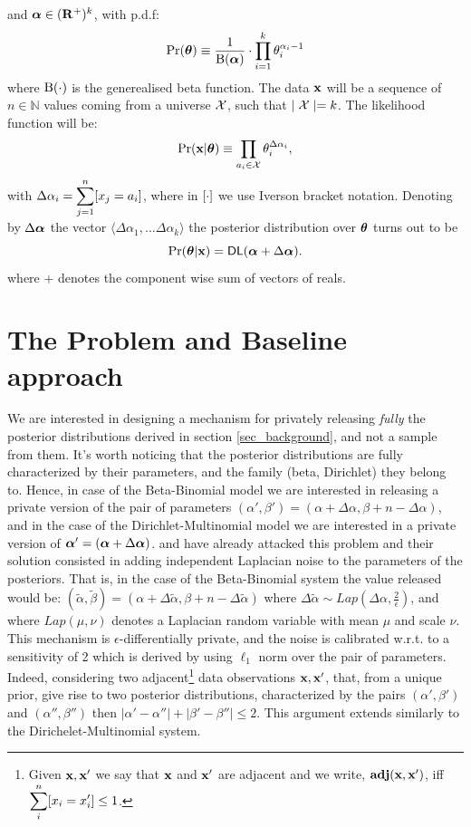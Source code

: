 \documentclass[sigconf, anonymous]{acmart}
\begin{document}
and $\boldsymbol{\alpha}\in(\mathbf{R^{+}})^{k}$, with p.d.f:
\[
  \Pr(\boldsymbol{\theta})\equiv\frac{1}{\boldsymbol{\textup{B}}(\boldsymbol{\alpha})}\cdot \displaystyle\prod_{i=1}^{k}{\theta_i^{\alpha_i-1}}
\]
where $\boldsymbol{\textup{B}}(\cdot)$ is the generealised beta function.
The data $\textbf{x}$ will be a sequence of $n\in\mathbb{N}$ values coming from a universe $\mathcal{X}$, such that $\mid\mathcal{X} \mid=k$.
The likelihood function will be:
\[
  \Pr(\textbf{x}|\boldsymbol{\theta})\equiv \displaystyle\prod_{a_i\in\mathcal{X}}\theta_{i}^{\Delta \alpha_i},
\]
with $\Delta \alpha_i=\displaystyle\sum_{j=1}^{n}[x_j=a_i]$, where in $[\cdot]$ we use
Iverson bracket notation. Denoting by $\Delta\boldsymbol{\alpha}$ the vector $\langle  \Delta\alpha_1,\dots \Delta\alpha_k \rangle$ the posterior distribution over $\boldsymbol{\theta}$ turns out to be
\[
  \Pr(\boldsymbol{\theta}|\textbf{x})=\mathsf{DL}(\boldsymbol{\alpha}+\Delta \boldsymbol{\alpha}). 
\]
where $+$ denotes the component wise  sum of vectors of reals. 


\section{The Problem and Baseline approach}
\label{sec:base}
We are interested in designing a mechanism for privately releasing
\emph{fully} the posterior distributions derived in section \ref{sec_background},
and not a sample from them.  It's worth noticing that the posterior
distributions are fully characterized by their parameters, and the
family (beta, Dirichlet) they belong to.  Hence, in case of the
Beta-Binomial model we are interested in releasing a private version
of the pair of parameters $(\alpha',\beta')=(\alpha + \Delta \alpha,\beta + n - \Delta \alpha)$, and
in the case of the Dirichlet-Multinomial model we are interested in a
private version of $\boldsymbol{\alpha}'=(\boldsymbol{\alpha} + \Delta \boldsymbol{\alpha})$. \citet{zhang2016differential} and \citet{xiao2012bayesian} have
already attacked this problem and their solution consisted in adding
independent Laplacian noise to the parameters of the posteriors. That
is, in the case of the Beta-Binomial system the value released would
be: $(\tilde\alpha,\tilde\beta)=(\alpha + \Delta \tilde\alpha,\beta + n - \Delta \tilde\alpha)$ where $\Delta \tilde\alpha\sim Lap(\Delta \alpha, \frac{2}{\epsilon})$, and
where $Lap(\mu,\nu)$
denotes a Laplacian random variable with mean $\mu$ and scale $\nu$.
This mechanism is $\epsilon$-differentially private, and the noise is
calibrated w.r.t. to a sensitivity of 2 which is derived by using
$\ell_1$ norm over the pair of parameters. Indeed, considering two
adjacent\footnote{Given $\textbf{x}, \textbf{x}'$  we say that $\textbf{x}$ and $\textbf{x}'$ are adjacent and we write, $\textbf{adj}(\textbf{x},\textbf{x}')$, iff\\
$\displaystyle \sum_{i}^{n}[x_i = x'_i ]\leq 1$. } data observations
$\textbf{x}, \textbf{x}'$, that, from a unique prior, give rise to two posterior
distributions, characterized by the pairs
$(\alpha',\beta')$ and $(\alpha'',\beta'')$ then
$|\alpha'-\alpha''|+|\beta'-\beta''|\leq 2$.
This argument extends similarly to the Dirichelet-Multinomial system.
\end{document}
